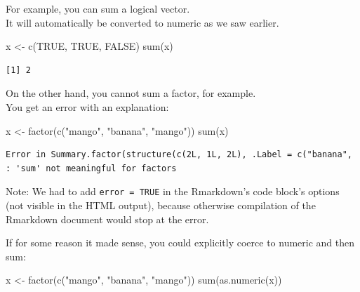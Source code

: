 \documentclass[
]{book}
\newenvironment{Shaded}{\begin{snugshade}}{\end{snugshade}}
\newcommand{\ConstantTok}[1]{\textcolor[rgb]{0.00,0.00,0.00}{#1}}
\newcommand{\FunctionTok}[1]{\textcolor[rgb]{0.00,0.00,0.00}{#1}}
\newcommand{\NormalTok}[1]{#1}
\newcommand{\OtherTok}[1]{\textcolor[rgb]{0.56,0.35,0.01}{#1}}
\newcommand{\StringTok}[1]{\textcolor[rgb]{0.31,0.60,0.02}{#1}}
\begin{document}
For example, you can sum a logical vector.\\
It will automatically be converted to numeric as we saw earlier.

\begin{Shaded}
\begin{Highlighting}[]
\NormalTok{x }\OtherTok{\textless{}{-}} \FunctionTok{c}\NormalTok{(}\ConstantTok{TRUE}\NormalTok{, }\ConstantTok{TRUE}\NormalTok{, }\ConstantTok{FALSE}\NormalTok{)}
\FunctionTok{sum}\NormalTok{(x)}
\end{Highlighting}
\end{Shaded}

\begin{verbatim}
[1] 2
\end{verbatim}

On the other hand, you cannot sum a factor, for example.\\
You get an error with an explanation:

\begin{Shaded}
\begin{Highlighting}[]
\NormalTok{x }\OtherTok{\textless{}{-}} \FunctionTok{factor}\NormalTok{(}\FunctionTok{c}\NormalTok{(}\StringTok{"mango"}\NormalTok{, }\StringTok{"banana"}\NormalTok{, }\StringTok{"mango"}\NormalTok{))}
\FunctionTok{sum}\NormalTok{(x)}
\end{Highlighting}
\end{Shaded}

\begin{verbatim}
Error in Summary.factor(structure(c(2L, 1L, 2L), .Label = c("banana", : 'sum' not meaningful for factors
\end{verbatim}

\begin{rmdnote}
Note: We had to add \texttt{error\ =\ TRUE} in the Rmarkdown's code
block's options (not visible in the HTML output), because otherwise
compilation of the Rmarkdown document would stop at the error.
\end{rmdnote}

If for some reason it made sense, you could explicitly coerce to numeric and then sum:

\begin{Shaded}
\begin{Highlighting}[]
\NormalTok{x }\OtherTok{\textless{}{-}} \FunctionTok{factor}\NormalTok{(}\FunctionTok{c}\NormalTok{(}\StringTok{"mango"}\NormalTok{, }\StringTok{"banana"}\NormalTok{, }\StringTok{"mango"}\NormalTok{))}
\FunctionTok{sum}\NormalTok{(}\FunctionTok{as.numeric}\NormalTok{(x))}
\end{Highlighting}
\end{Shaded}
\end{document}
